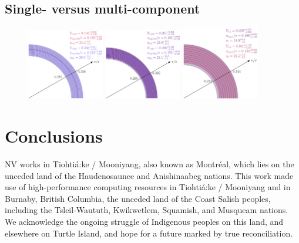 \documentclass[twocolumn, twocolappendix]{aastex63}
\begin{document}
\subsection{Single- versus multi-component}

\begin{figure}[!ht]
    \includegraphics[width=0.3\textwidth]{figs/multicomp_wedges_1.4d.png}
    \includegraphics[width=0.3\textwidth]{figs/multicomp_wedges_2.4d.png}
    \includegraphics[width=0.3\textwidth]{figs/multicomp_wedges_3.4d.png}
    \label{fig:infer_multicomp_wedges}
\end{figure}



\section{Conclusions}\label{sec:conclusions}



\acknowledgments


NV works in Tiohti{\'a}:ke / Mooniyang, also known as Montr{\'e}al, which lies on the unceded land of the Haudenosaunee and Anishinaabeg nations. This work made use of high-performance computing resources in Tiohti{\'a}:ke / Mooniyang and in Burnaby, British Columbia, the unceded land of the Coast Salish peoples, including the Tsleil-Waututh, Kwikwetlem, Squamish, and Musqueam nations. We acknowledge the ongoing struggle of Indigenous peoples on this land, and elsewhere on Turtle Island, and hope for a future marked by true reconciliation. 
\end{document}
